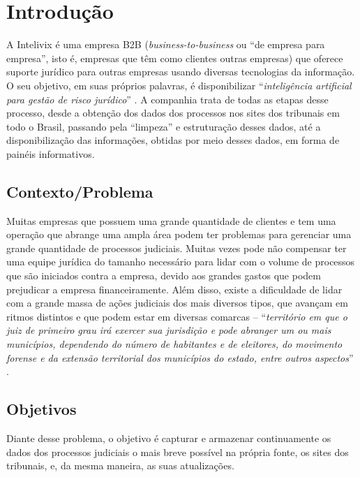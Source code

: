 \section{Introdução}
\label{sec:intro}
A Intelivix é uma empresa B2B (\textit{business-to-business} ou \enquote{de empresa para empresa}, isto é, empresas que têm como clientes outras empresas) que oferece suporte jurídico para outras empresas usando diversas tecnologias da informação. O seu objetivo, em suas próprios palavras, é disponibilizar \enquote{\textit{inteligência artificial para gestão de risco jurídico}} \cite{intelivix:2021}. A companhia trata de todas as etapas desse processo, desde a obtenção dos dados dos processos nos sites dos tribunais em todo o Brasil, passando pela \enquote{limpeza} e estruturação desses dados, até a disponibilização das informações, obtidas por meio desses dados, em forma de painéis informativos.

\subsection{Contexto/Problema}
\label{subsec:contexto}
Muitas empresas que possuem uma grande quantidade de clientes e tem uma operação que abrange uma ampla área podem ter problemas para gerenciar uma grande quantidade de processos judiciais. Muitas vezes pode não compensar ter uma equipe jurídica do tamanho necessário para lidar com o volume de processos que são iniciados contra a empresa, devido aos grandes gastos que podem prejudicar a empresa financeiramente. Além disso, existe a dificuldade de lidar com a grande massa de ações judiciais dos mais diversos tipos, que avançam em ritmos distintos e que podem estar em diversas comarcas – \enquote{\textit{território em que o juiz de primeiro grau irá exercer sua jurisdição e pode abranger um ou mais municípios, dependendo do número de habitantes e de eleitores, do movimento forense e da extensão territorial dos municípios do estado, entre outros aspectos}} \cite{cnj:comarca}.
 

\subsection{Objetivos}
\label{subsec:objetivos}
Diante desse problema, o objetivo é capturar e armazenar continuamente os dados dos processos judiciais o mais breve possível na própria fonte, os sites dos tribunais, e, da mesma maneira, as suas atualizações.

